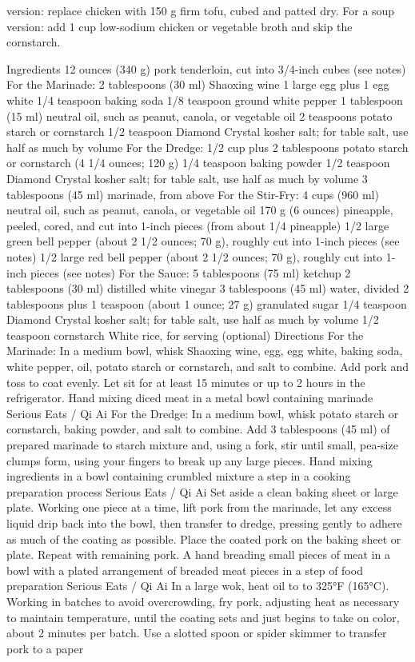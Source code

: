 version: replace chicken with 150 g firm tofu, cubed and patted dry. For a soup version: add 1 cup low-sodium chicken or vegetable broth and skip the cornstarch.
\par

Ingredients 12 ounces (340 g) pork tenderloin, cut into 3/4-inch cubes (see notes) For the Marinade: 2 tablespoons (30 ml) Shaoxing wine 1 large egg plus 1 egg white 1/4 teaspoon baking soda 1/8 teaspoon ground white pepper 1 tablespoon (15 ml) neutral oil, such as peanut, canola, or vegetable oil 2 teaspoons potato starch or cornstarch 1/2 teaspoon Diamond Crystal kosher salt; for table salt, use half as much by volume For the Dredge: 1/2 cup plus 2 tablespoons potato starch or cornstarch (4 1/4 ounces; 120 g) 1/4 teaspoon baking powder 1/2 teaspoon Diamond Crystal kosher salt; for table salt, use half as much by volume 3 tablespoons (45 ml) marinade, from above For the Stir-Fry: 4 cups (960 ml) neutral oil, such as peanut, canola, or vegetable oil 170 g (6 ounces) pineapple, peeled, cored, and cut into 1-inch pieces (from about 1/4 pineapple) 1/2 large green bell pepper (about 2 1/2 ounces; 70 g), roughly cut into 1-inch pieces (see notes) 1/2 large red bell pepper (about 2 1/2 ounces; 70 g), roughly cut into 1-inch pieces (see notes) For the Sauce: 5 tablespoons (75 ml) ketchup 2 tablespoons (30 ml) distilled white vinegar 3 tablespoons (45 ml) water, divided 2 tablespoons plus 1 teaspoon (about 1 ounce; 27 g) granulated sugar 1/4 teaspoon Diamond Crystal kosher salt; for table salt, use half as much by volume 1/2 teaspoon cornstarch White rice, for serving (optional) Directions For the Marinade: In a medium bowl, whisk Shaoxing wine, egg, egg white, baking soda, white pepper, oil, potato starch or cornstarch, and salt to combine. Add pork and toss to coat evenly. Let sit for at least 15 minutes or up to 2 hours in the refrigerator. Hand mixing diced meat in a metal bowl containing marinade Serious Eats / Qi Ai For the Dredge: In a medium bowl, whisk potato starch or cornstarch, baking powder, and salt to combine. Add 3 tablespoons (45 ml) of prepared marinade to starch mixture and, using a fork, stir until small, pea-size clumps form, using your fingers to break up any large pieces. Hand mixing ingredients in a bowl containing crumbled mixture a step in a cooking preparation process Serious Eats / Qi Ai Set aside a clean baking sheet or large plate. Working one piece at a time, lift pork from the marinade, let any excess liquid drip back into the bowl, then transfer to dredge, pressing gently to adhere as much of the coating as possible. Place the coated pork on the baking sheet or plate. Repeat with remaining pork. A hand breading small pieces of meat in a bowl with a plated arrangement of breaded meat pieces in a step of food preparation Serious Eats / Qi Ai In a large wok, heat oil to to 325°F (165°C). Working in batches to avoid overcrowding, fry pork, adjusting heat as necessary to maintain temperature, until the coating sets and just begins to take on color, about 2 minutes per batch. Use a slotted spoon or spider skimmer to transfer pork to a paper 